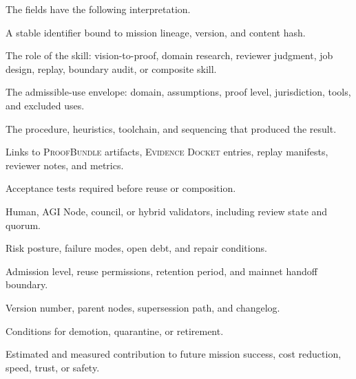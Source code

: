 \documentclass[10.5pt,oneside]{article}
\newcommand{\proofbundle}{\textsc{ProofBundle}}
\newcommand{\evidencedocket}{\textsc{Evidence Docket}}
\begin{document}
\noindent The fields have the following interpretation.
\begin{description}[leftmargin=2.2cm,style=nextline]
\item[\texttt{id}] A stable identifier bound to mission lineage, version, and content hash.
\item[\texttt{type}] The role of the skill: vision-to-proof, domain research, reviewer judgment, job design, replay, boundary audit, or composite skill.
\item[\texttt{scope}] The admissible-use envelope: domain, assumptions, proof level, jurisdiction, tools, and excluded uses.
\item[\texttt{method}] The procedure, heuristics, toolchain, and sequencing that produced the result.
\item[\texttt{evidence}] Links to \proofbundle{} artifacts, \evidencedocket{} entries, replay manifests, reviewer notes, and metrics.
\item[\texttt{tests}] Acceptance tests required before reuse or composition.
\item[\texttt{validators}] Human, AGI Node, council, or hybrid validators, including review state and quorum.
\item[\texttt{risk}] Risk posture, failure modes, open debt, and repair conditions.
\item[\texttt{policy}] Admission level, reuse permissions, retention period, and mainnet handoff boundary.
\item[\texttt{version}] Version number, parent nodes, supersession path, and changelog.
\item[\texttt{rollback}] Conditions for demotion, quarantine, or retirement.
\item[\texttt{utility}] Estimated and measured contribution to future mission success, cost reduction, speed, trust, or safety.
\end{description}
\end{document}
